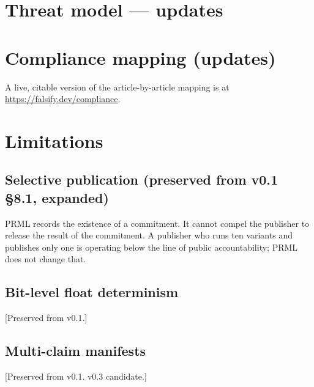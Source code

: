 \documentclass[11pt, a4paper]{article}
\begin{document}
\section{Threat model — updates}
\label{sec:threat}


\section{Compliance mapping (updates)}
\label{sec:compliance}


A live, citable version of the article-by-article mapping is at \url{https://falsify.dev/compliance}.

\section{Limitations}
\label{sec:limits}

\subsection{Selective publication (preserved from v0.1 §8.1, expanded)}

PRML records the existence of a commitment. It cannot compel the publisher to release the result of the commitment. A publisher who runs ten variants and publishes only one is operating below the line of public accountability; PRML does not change that.

\subsection{Bit-level float determinism}

[Preserved from v0.1.]

\subsection{Multi-claim manifests}

[Preserved from v0.1. v0.3 candidate.]
\end{document}
